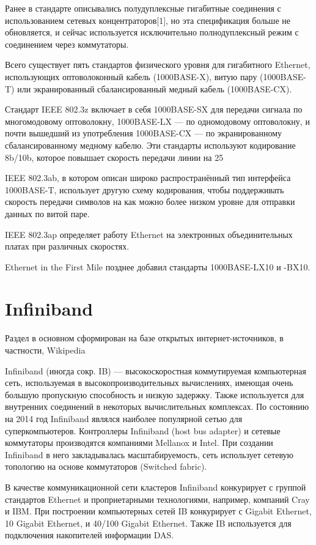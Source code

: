 Ранее в стандарте описывались полудуплексные гигабитные соединения с использованием сетевых концентраторов[1], но эта спецификация больше не обновляется, и сейчас используется исключительно полнодуплексный режим с соединением через коммутаторы. 


Всего существует пять стандартов физического уровня для гигабитного Ethernet, использующих оптоволоконный кабель (1000BASE-X), витую пару (1000BASE-T) или экранированный сбалансированный медный кабель (1000BASE-CX).

Стандарт IEEE 802.3z включает в себя 1000BASE-SX для передачи сигнала по многомодовому оптоволокну, 1000BASE-LX — по одномодовому оптоволокну, и почти вышедший из употребления 1000BASE-CX — по экранированному сбалансированному медному кабелю. Эти стандарты используют кодирование 8b/10b, которое повышает скорость передачи линии на 25 %

IEEE 802.3ab, в котором описан широко распространённый тип интерфейса 1000BASE-T, использует другую схему кодирования, чтобы поддерживать скорость передачи символов на как можно более низком уровне для отправки данных по витой паре.

IEEE 802.3ap определяет работу Ethernet на электронных объединительных платах при различных скоростях.

Ethernet in the First Mile позднее добавил стандарты 1000BASE-LX10 и -BX10. 

\section{Infiniband}
Раздел в основном сформирован на базе открытых интернет-источников, в частности, Wikipedia 

Infiniband (иногда сокр. IB) — высокоскоростная коммутируемая компьютерная сеть, используемая в высокопроизводительных вычислениях, имеющая очень большую пропускную способность и низкую задержку. Также используется для внутренних соединений в некоторых вычислительных комплексах. По состоянию на 2014 год Infiniband являлся наиболее популярной сетью для суперкомпьютеров. Контроллеры Infiniband (host bus adapter) и сетевые коммутаторы производятся компаниями Mellanox и Intel. При создании Infiniband в него закладывалась масштабируемость, сеть использует сетевую топологию на основе коммутаторов (Switched fabric).

В качестве коммуникационной сети кластеров Infiniband конкурирует с группой стандартов Ethernet и проприетарными технологиями, например, компаний Cray и IBM. При построении компьютерных сетей IB конкурирует с Gigabit Ethernet, 10 Gigabit Ethernet, и 40/100 Gigabit Ethernet. Также IB используется для подключения накопителей информации DAS. 

